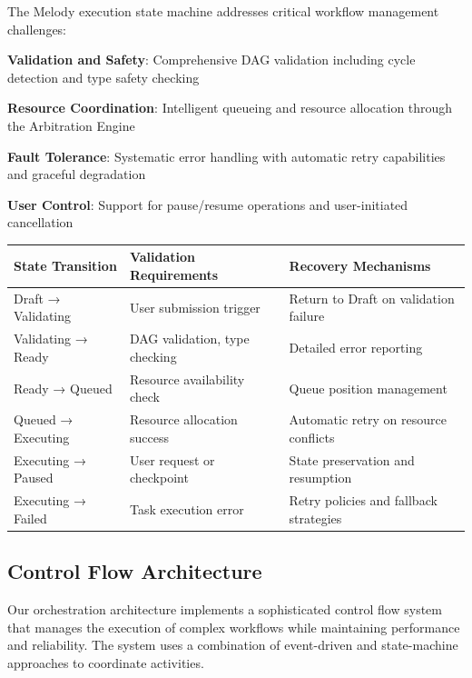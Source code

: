 The Melody execution state machine addresses critical workflow management challenges:

\begin{expandedlist}
    \item \textbf{Validation and Safety}: Comprehensive DAG validation including cycle detection and type safety checking
    \item \textbf{Resource Coordination}: Intelligent queueing and resource allocation through the Arbitration Engine
    \item \textbf{Fault Tolerance}: Systematic error handling with automatic retry capabilities and graceful degradation
    \item \textbf{User Control}: Support for pause/resume operations and user-initiated cancellation
\end{expandedlist}

\begin{center}
\begin{tabular}{@{}lll@{}}
\toprule
\textbf{State Transition} & \textbf{Validation Requirements} & \textbf{Recovery Mechanisms} \\
\midrule
Draft → Validating & User submission trigger & Return to Draft on validation failure \\
Validating → Ready & DAG validation, type checking & Detailed error reporting \\
Ready → Queued & Resource availability check & Queue position management \\
Queued → Executing & Resource allocation success & Automatic retry on resource conflicts \\
Executing → Paused & User request or checkpoint & State preservation and resumption \\
Executing → Failed & Task execution error & Retry policies and fallback strategies \\
\bottomrule
\end{tabular}
\end{center}

\subsection*{Control Flow Architecture}

Our orchestration architecture implements a sophisticated control flow system that manages the execution of complex workflows while maintaining performance and reliability. The system uses a combination of event-driven and state-machine approaches to coordinate activities.


